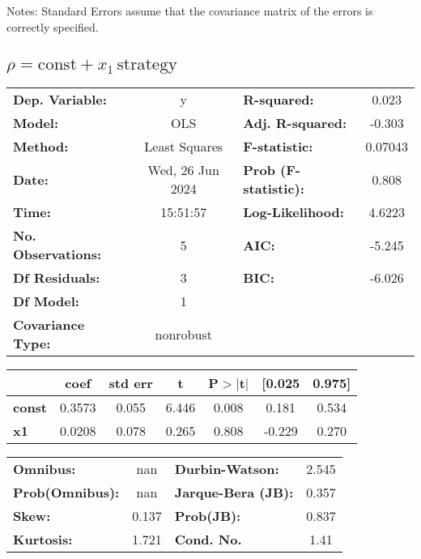 \documentclass{article}
\begin{document}
Notes: \newline
[1] Standard Errors assume that the covariance matrix of the errors is correctly specified.

\subsection{$\rho = \text{const} + x_1\,\text{strategy}$}

\begin{center}
    \begin{tabular}{lclc}
        \toprule
        \textbf{Dep. Variable:}    & y                & \textbf{  R-squared:         } & 0.023   \\
        \textbf{Model:}            & OLS              & \textbf{  Adj. R-squared:    } & -0.303  \\
        \textbf{Method:}           & Least Squares    & \textbf{  F-statistic:       } & 0.07043 \\
        \textbf{Date:}             & Wed, 26 Jun 2024 & \textbf{  Prob (F-statistic):} & 0.808   \\
        \textbf{Time:}             & 15:51:57         & \textbf{  Log-Likelihood:    } & 4.6223  \\
        \textbf{No. Observations:} & 5                & \textbf{  AIC:               } & -5.245  \\
        \textbf{Df Residuals:}     & 3                & \textbf{  BIC:               } & -6.026  \\
        \textbf{Df Model:}         & 1                & \textbf{                     } &         \\
        \textbf{Covariance Type:}  & nonrobust        & \textbf{                     } &         \\
        \bottomrule
    \end{tabular}
    \begin{tabular}{lcccccc}
                       & \textbf{coef} & \textbf{std err} & \textbf{t} & \textbf{P$> |$t$|$} & \textbf{[0.025} & \textbf{0.975]} \\
        \midrule
        \textbf{const} & 0.3573        & 0.055            & 6.446      & 0.008               & 0.181           & 0.534           \\
        \textbf{x1}    & 0.0208        & 0.078            & 0.265      & 0.808               & -0.229          & 0.270           \\
        \bottomrule
    \end{tabular}
    \begin{tabular}{lclc}
        \textbf{Omnibus:}       & nan   & \textbf{  Durbin-Watson:     } & 2.545 \\
        \textbf{Prob(Omnibus):} & nan   & \textbf{  Jarque-Bera (JB):  } & 0.357 \\
        \textbf{Skew:}          & 0.137 & \textbf{  Prob(JB):          } & 0.837 \\
        \textbf{Kurtosis:}      & 1.721 & \textbf{  Cond. No.          } & 1.41  \\
        \bottomrule
    \end{tabular}
\end{center}
\end{document}
